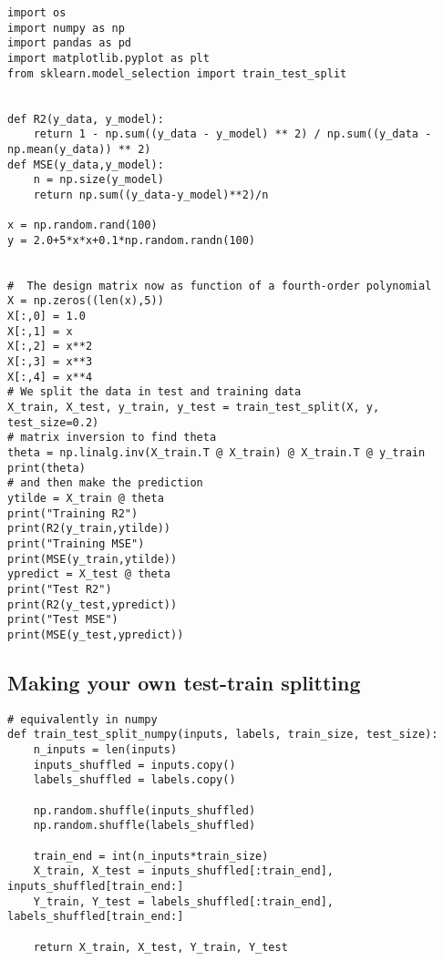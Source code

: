 \documentclass[%
oneside,                 %
final,                   %
10pt]{article}
\begin{document}
\begin{verbatim}
import os
import numpy as np
import pandas as pd
import matplotlib.pyplot as plt
from sklearn.model_selection import train_test_split


def R2(y_data, y_model):
    return 1 - np.sum((y_data - y_model) ** 2) / np.sum((y_data - np.mean(y_data)) ** 2)
def MSE(y_data,y_model):
    n = np.size(y_model)
    return np.sum((y_data-y_model)**2)/n

x = np.random.rand(100)
y = 2.0+5*x*x+0.1*np.random.randn(100)


#  The design matrix now as function of a fourth-order polynomial
X = np.zeros((len(x),5))
X[:,0] = 1.0
X[:,1] = x
X[:,2] = x**2
X[:,3] = x**3
X[:,4] = x**4
# We split the data in test and training data
X_train, X_test, y_train, y_test = train_test_split(X, y, test_size=0.2)
# matrix inversion to find theta
theta = np.linalg.inv(X_train.T @ X_train) @ X_train.T @ y_train
print(theta)
# and then make the prediction
ytilde = X_train @ theta
print("Training R2")
print(R2(y_train,ytilde))
print("Training MSE")
print(MSE(y_train,ytilde))
ypredict = X_test @ theta
print("Test R2")
print(R2(y_test,ypredict))
print("Test MSE")
print(MSE(y_test,ypredict))

\end{verbatim}


\subsection*{Making your own test-train splitting}
















\begin{verbatim}
# equivalently in numpy
def train_test_split_numpy(inputs, labels, train_size, test_size):
    n_inputs = len(inputs)
    inputs_shuffled = inputs.copy()
    labels_shuffled = labels.copy()

    np.random.shuffle(inputs_shuffled)
    np.random.shuffle(labels_shuffled)

    train_end = int(n_inputs*train_size)
    X_train, X_test = inputs_shuffled[:train_end], inputs_shuffled[train_end:]
    Y_train, Y_test = labels_shuffled[:train_end], labels_shuffled[train_end:]

    return X_train, X_test, Y_train, Y_test

\end{verbatim}
\end{document}
